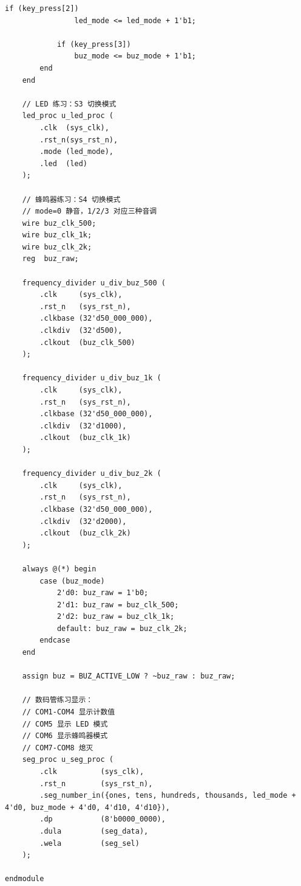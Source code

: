 \documentclass[a4paper,10pt]{article}
\begin{document}
\begin{lstlisting}[caption=top.v]
            if (key_press[2])
                led_mode <= led_mode + 1'b1;

            if (key_press[3])
                buz_mode <= buz_mode + 1'b1;
        end
    end

    // LED 练习：S3 切换模式
    led_proc u_led_proc (
        .clk  (sys_clk),
        .rst_n(sys_rst_n),
        .mode (led_mode),
        .led  (led)
    );

    // 蜂鸣器练习：S4 切换模式
    // mode=0 静音，1/2/3 对应三种音调
    wire buz_clk_500;
    wire buz_clk_1k;
    wire buz_clk_2k;
    reg  buz_raw;

    frequency_divider u_div_buz_500 (
        .clk     (sys_clk),
        .rst_n   (sys_rst_n),
        .clkbase (32'd50_000_000),
        .clkdiv  (32'd500),
        .clkout  (buz_clk_500)
    );

    frequency_divider u_div_buz_1k (
        .clk     (sys_clk),
        .rst_n   (sys_rst_n),
        .clkbase (32'd50_000_000),
        .clkdiv  (32'd1000),
        .clkout  (buz_clk_1k)
    );

    frequency_divider u_div_buz_2k (
        .clk     (sys_clk),
        .rst_n   (sys_rst_n),
        .clkbase (32'd50_000_000),
        .clkdiv  (32'd2000),
        .clkout  (buz_clk_2k)
    );

    always @(*) begin
        case (buz_mode)
            2'd0: buz_raw = 1'b0;
            2'd1: buz_raw = buz_clk_500;
            2'd2: buz_raw = buz_clk_1k;
            default: buz_raw = buz_clk_2k;
        endcase
    end

    assign buz = BUZ_ACTIVE_LOW ? ~buz_raw : buz_raw;

    // 数码管练习显示：
    // COM1-COM4 显示计数值
    // COM5 显示 LED 模式
    // COM6 显示蜂鸣器模式
    // COM7-COM8 熄灭
    seg_proc u_seg_proc (
        .clk          (sys_clk),
        .rst_n        (sys_rst_n),
        .seg_number_in({ones, tens, hundreds, thousands, led_mode + 4'd0, buz_mode + 4'd0, 4'd10, 4'd10}),
        .dp           (8'b0000_0000),
        .dula         (seg_data),
        .wela         (seg_sel)
    );

endmodule

\end{lstlisting}
\end{document}
